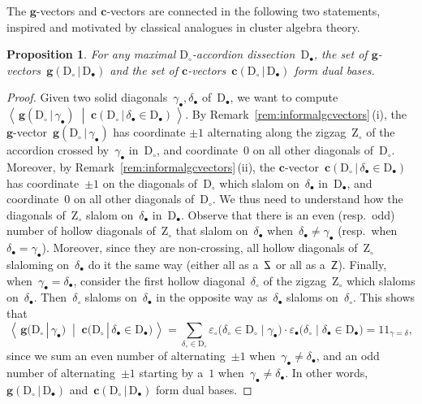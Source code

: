 \documentclass{amsart}
\newtheorem{proposition}[theorem]{Proposition}
\theoremstyle{definition}
\renewcommand{\b}[1]{\mathbf{#1}} %
\newcommand{\dotprod}[2]{\left\langle \, #1 \; \middle| \; #2 \, \right\rangle} %
\newcommand{\one}{{1\!\!1}} %
\newcommand{\dissection}{\mathrm{D}} %
\newcommand{\zigzag}{\mathrm{Z}} %
\newcommand{\signcirc}[3]{{\varepsilon_\circ \big( {#1} \in {#2} \;|\; {#3} \big)}} %
\newcommand{\signbullet}[3]{{\varepsilon_\bullet \big( {#1} \;|\; {#3} \in {#2} \big)}} %
\newcommand{\SSS}{\reflectbox{$\mathsf{Z}$}} %
\newcommand{\ZZZ}{\mathsf{Z}} %
\newcommand{\gvector}[2]{\mathbf{g}(#1 \,|\, #2)} %
\newcommand{\biggvector}[2]{\mathbf{g} \big( #1 \,|\, #2 \big)} %
\newcommand{\gvectors}[2]{\mathbf{g}(#1 \,|\, #2)} %
\newcommand{\cvector}[3]{\mathbf{c}(#1  \,|\, #3 \in #2)} %
\newcommand{\bigcvector}[3]{\mathbf{c} \big( #1  \,|\, #3 \in #2 \big)} %
\newcommand{\cvectors}[2]{\mathbf{c}(#1  \,|\, #2)} %
\begin{document}
The $\b{g}$-vectors and $\b{c}$-vectors are connected in the following two statements, inspired and motivated by classical analogues in cluster algebra theory.

\begin{proposition}
\label{prop:gvectorscvectorsDualBases}
For any maximal $\dissection_\circ$-accordion dissection~$\dissection_\bullet$, the set of $\b{g}$-vectors~$\gvectors{\dissection_\circ}{\dissection_\bullet}$ and the set of $\b{c}$-vectors~$\cvectors{\dissection_\circ}{\dissection_\bullet}$ form dual bases.
\end{proposition}

\begin{proof}
Given two solid diagonals~$\gamma_\bullet, \delta_\bullet$ of~$\dissection_\bullet$, we want to  compute~$\dotprod{\gvector{\dissection_\circ}{\gamma_\bullet}}{\cvector{\dissection_\circ}{\dissection_\bullet}{\delta_\bullet}}$. By Remark~\ref{rem:informalgcvectors}\,(i), the $\b{g}$-vector~$\gvector{\dissection_\circ}{\gamma_\bullet}$ has coordinate $\pm 1$ alternating along the zigzag~$\zigzag_\circ$ of the accordion crossed by~$\gamma_\bullet$ in~$\dissection_\circ$, and coordinate~$0$ on all other diagonals of~$\dissection_\circ$. Moreover, by Remark~\ref{rem:informalgcvectors}\,(ii), the $\b{c}$-vector~$\cvector{\dissection_\circ}{\dissection_\bullet}{\delta_\bullet}$ has coordinate~$\pm 1$ on the diagonals of~$\dissection_\circ$ which slalom on~$\delta_\bullet$ in~$\dissection_\bullet$, and coordinate~$0$ on all other diagonals of~$\dissection_\circ$. We thus need to understand how the diagonals of~$\zigzag_\circ$ slalom on~$\delta_\bullet$ in~$\dissection_\bullet$. Observe that there is an even (resp.~odd) number of hollow diagonals of~$\zigzag_\circ$ that slalom on~$\delta_\bullet$ when~$\delta_\bullet \ne \gamma_\bullet$ (resp.~when~$\delta_\bullet = \gamma_\bullet$). Moreover, since they are non-crossing, all hollow diagonals of~$\zigzag_\circ$ slaloming on~$\delta_\bullet$ do it the same way (either all as a~$\SSS$ or all as a~$\ZZZ$). Finally, when~$\gamma_\bullet = \delta_\bullet$, consider the first hollow diagonal~$\delta_\circ$ of the zigzag~$\zigzag_\circ$ which slaloms on~$\delta_\bullet$. Then~$\delta_\circ$ slaloms on~$\delta_\bullet$ in the opposite way as~$\delta_\bullet$ slaloms on~$\delta_\circ$. This shows that
\[
\dotprod{\biggvector{\dissection_\circ}{\gamma_\bullet}}{\bigcvector{\dissection_\circ}{\dissection_\bullet}{\delta_\bullet}} = \sum_{\delta_\circ \in \dissection_\circ} \signcirc{\delta_\circ}{\dissection_\circ}{\gamma_\bullet} \cdot \signbullet{\delta_\circ}{\dissection_\bullet}{\delta_\bullet} = \one_{\gamma = \delta},
\]
since we sum an even number of alternating~$\pm 1$ when~$\gamma_\bullet \ne \delta_\bullet$, and an odd number of alternating~$\pm 1$ starting by a~$1$ when~$\gamma_\bullet \ne \delta_\bullet$. In other words, $\gvectors{\dissection_\circ}{\dissection_\bullet}$ and~$\cvectors{\dissection_\circ}{\dissection_\bullet}$ form dual bases.
\end{proof}
\end{document}
